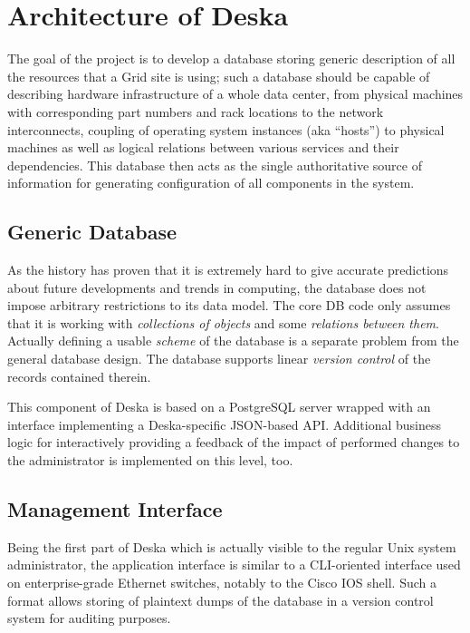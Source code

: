 \documentclass[a4paper]{jpconf}
\begin{document}
\section{Architecture of Deska}

The goal of the project is to develop a database storing generic description of all the resources that a Grid site is using;
such a database should be capable of describing hardware infrastructure of a whole data center, from physical machines with
corresponding part numbers and rack locations to the network interconnects, coupling of operating system instances (aka ``hosts'') to
physical machines as well as logical relations between various services and their dependencies.  This database then acts as the
single authoritative source of information for generating configuration of all components in the system.

\subsection{Generic Database}

As the history has proven that it is extremely hard to give accurate predictions about future developments and trends in computing,
the database does not impose arbitrary restrictions to its data model.  The core DB code only assumes that it is working with {\em
collections of objects} and some {\em relations between them}. Actually defining a usable {\em scheme} of the database is a separate
problem from the general database design.  The database supports linear {\em version control} of the records contained therein.

This component of Deska is based on a PostgreSQL server wrapped with an interface implementing a Deska-specific JSON-based API.
Additional business logic for interactively providing a feedback of the impact of performed changes to the administrator is implemented
on this level, too.

\subsection{Management Interface}

Being the first part of Deska which is actually visible to the regular Unix system administrator, the application interface is similar
to a CLI-oriented interface used on enterprise-grade Ethernet switches, notably to the Cisco IOS shell.  Such a format allows storing
of plaintext dumps of the database in a version control system for auditing purposes.
\end{document}

